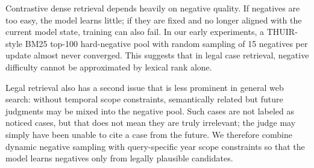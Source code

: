 Contrastive dense retrieval depends heavily on negative quality. If negatives are too easy, the model learns little; if they are fixed and no longer aligned with the current model state, training can also fail. In our early experiments, a THUIR-style BM25 top-100 hard-negative pool with random sampling of 15 negatives per update almost never converged. This suggests that in legal case retrieval, negative difficulty cannot be approximated by lexical rank alone.

Legal retrieval also has a second issue that is less prominent in general web search: without temporal scope constraints, semantically related but future judgments may be mixed into the negative pool. Such cases are not labeled as noticed cases, but that does not mean they are truly irrelevant; the judge may simply have been unable to cite a case from the future. We therefore combine dynamic negative sampling with query-specific year scope constraints so that the model learns negatives only from legally plausible candidates.
